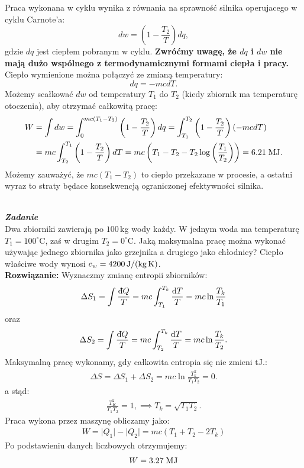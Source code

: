 \documentclass[11pt,a4paper]{article}
\newcounter{zadanie}\newcommand{\zadanie}[1][]{\addtocounter{zadanie}{1} ~\\  {\bf \emph{Zadanie \arabic{zadanie} #1 }} \\}
\newcounter{zaddom}\newcommand{\zaddom}[1][]{\addtocounter{zaddom}{1} ~\\  {\bf \emph{Zadanie domowe \arabic{zaddom} #1 }} \\}
\newcommand{\dbar}{{\mkern3mu\mathchar'26\mkern-12mu d}}
\begin{document}
Praca wykonana w cyklu wynika z równania na sprawność silnika operujacego w cyklu Carnote'a:
\begin{equation}
dw = \left(1-\frac{T_2}{T}\right) dq,
\end{equation} 
gdzie $dq$ jest ciepłem pobranym w cyklu. \textbf{Zwróćmy uwagę, że $dq$ i $dw$ nie mają dużo wspólnego z termodynamicznymi formami ciepła i pracy.} Ciepło wymienione można połączyć ze zmianą temperatury:
\begin{equation}
dq = -m c d T.
\end{equation}
Możemy scałkować $dw$ od temperatury $T_1$ do $T_2$ (kiedy zbiornik ma temperaturę otoczenia), aby otrzymać całkowitą pracę:
\begin{align}
W &= \int dw = \int_0^{mc (T_1-T_2)} \left(1-\frac{T_2}{T}\right) dq = \int_{T_1}^{T_2} \left(1-\frac{T_2}{T}\right) (-m c dT) \\
&= mc \int_{T_2}^{T_1}\left(1-\frac{T_2}{T}\right) dT = mc \left(T_1-T_2 - T_2 \log\left(\frac{T_1}{T_2}\right)\right) = 6.21\; {\rm MJ}.
\end{align} 
Możemy zauważyć, że $mc \left(T_1-T_2\right)$ to ciepło przekazane w procesie, a ostatni wyraz to straty będace konsekwencją ograniczonej efektywności silnika. 

\newpage
\zadanie
Dwa zbiorniki zawierają po $100\,$kg wody każdy.
W jednym woda ma temperaturę $T_1=100^\circ$C,
zaś w drugim $T_2 = 0^\circ$C. Jaką maksymalna pracę można wykonać
używając jednego zbiornika jako grzejnika a drugiego jako chłodnicy?
Ciepło właściwe wody wynosi $c_w=4200\,{\rm J/(kg\, K)}$.
\\
\textbf{Rozwiązanie:}
Wyznaczmy zmianę entropii zbiorników:
\begin{align}
\Delta S_1 = \int \frac{{\rm \dbar}Q}{T} = mc \int_{T_1}^{T_k}\frac{ {\rm d}T}{T} = mc \ln{\frac{T_k}{T_1}} 
\end{align}
oraz
\begin{align}
\Delta S_2 = \int \frac{{\rm \dbar}Q}{T} = mc \int_{T_2}^{T_k}\frac{ {\rm d}T}{T} = mc \ln{\frac{T_k}{T_2}}. 
\end{align}
Maksymalną pracę wykonamy, gdy całkowita entropia się nie zmieni tJ.:
\begin{align}
\Delta S = \Delta S_1 + \Delta S_2 = mc \ln{\frac{T_k^2}{T_1 T_2}}=0.
\end{align}
a stąd:
\begin{align}
\frac{T_K^2}{T_1T_2}=1, \implies T_k = \sqrt{T_1 T_2}.
\end{align}
Praca wykona przez maszynę obliczamy jako:
\begin{align}
W = \lvert Q_1 \rvert  -\lvert  Q_2 \rvert =mc \left( T_1 +T_2 - 2 T_k\right)
\end{align}
Po podstawieniu danych liczbowych otrzymujemy:
\begin{align}
W= 3.27\; {\rm MJ}
\end{align}



\end{document}
